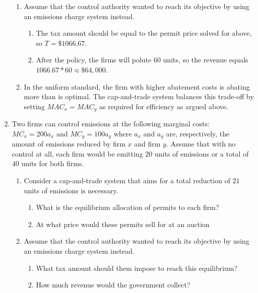\documentclass[11pt]{article}
\begin{document}
\begin{enumerate}
{\begin{enumerate}
\begin{enumerate}
        \item The permit price is equal to $MAC_x(a_x^*) = MAC_y(a_y^*) = 80 * 40/3 = 3200/3 \approx \$ 1066.67$. 
      \end{enumerate}
    
      \item Assume that the control authority wanted to reach its objective by using an emissions charge system instead.
      \begin{enumerate}
        \item The tax amount should be equal to the permit price solved for above, so $T = \$1066.67$. 
        
        \item After the policy, the firms will polute 60 units, so the revenue equals $1066.67 * 60 \approx \$ 64,000$. 
      \end{enumerate}
    
      \item In the uniform standard, the firm with higher abatement costs is abating more than is optimal. The cap-and-trade system balances this trade-off by setting $MAC_x = MAC_y$ as required for efficiency as argued above.
    \end{enumerate}
  }

  \item Two firms can control emissions at the following marginal costs: $MC_x = 200 a_x$ and $MC_y = 100 a_y$ where $a_x$ and $a_y$ are, respectively, the amount of emissions reduced by firm $x$ and firm $y$. Assume that with no control at all, each firm would be emitting $20$ units of emissions or a total of $40$ units for both firms.

  \begin{enumerate}
    \item Consider a cap-and-trade system that aims for a total reduction of $21$ units of emissions is necessary. 
    \begin{enumerate}
      \item What is the equilibrium allocation of permits to each firm?
      \item At what price would these permits sell for at an auction
    \end{enumerate}

    \item Assume that the control authority wanted to reach its objective by using an emissions
    charge system instead.
    \begin{enumerate}
      \item What tax amount should them impose to reach this equilibrium?
      \item How much revenue would the government collect?
    \end{enumerate}


\end{enumerate}
\end{enumerate}
\end{document}
